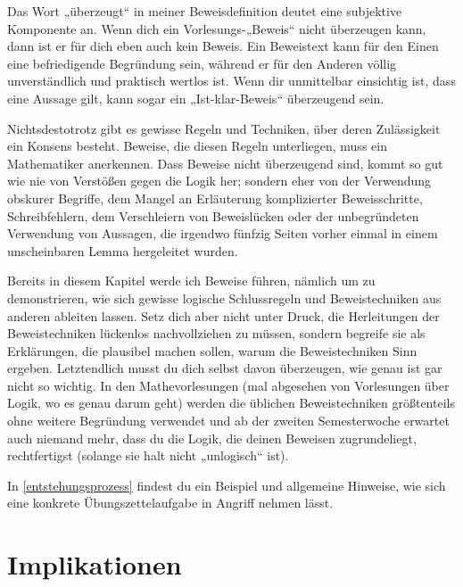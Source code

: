 \begin{bem}
    Das Wort „überzeugt“ in meiner Beweisdefinition deutet eine subjektive Komponente an. Wenn dich ein Vorlesungs-„Beweis“ nicht überzeugen kann, dann ist er für dich eben auch kein Beweis. Ein Beweistext kann für den Einen eine befriedigende Begründung sein, während er für den Anderen völlig unverständlich und praktisch wertlos ist. Wenn dir unmittelbar einsichtig ist, dass eine Aussage gilt, kann sogar ein „Ist-klar-Beweis“ überzeugend sein.
    
    Nichtsdestotrotz gibt es gewisse Regeln und Techniken, über deren Zulässigkeit ein Konsens besteht. Beweise, die diesen Regeln unterliegen, muss ein Mathematiker anerkennen. Dass Beweise nicht überzeugend sind, kommt so gut wie nie von Verstößen gegen die Logik her; sondern eher von der Verwendung obskurer Begriffe, dem Mangel an Erläuterung komplizierter Beweisschritte, Schreibfehlern, dem Verschleiern von Beweislücken oder der unbegründeten Verwendung von Aussagen, die irgendwo fünfzig Seiten vorher einmal in einem unscheinbaren Lemma hergeleitet wurden.
\end{bem}


Bereits in diesem Kapitel werde ich Beweise führen, nämlich um zu demonstrieren, wie sich gewisse logische Schlussregeln und Beweistechniken aus anderen ableiten lassen. Setz dich aber nicht unter Druck, die Herleitungen der Beweistechniken lückenlos nachvollziehen zu müssen, sondern begreife sie als Erklärungen, die plausibel machen sollen, warum die Beweistechniken Sinn ergeben. Letztendlich musst du dich selbst davon überzeugen, wie genau ist gar nicht so wichtig. In den Mathevorlesungen (mal abgesehen von Vorlesungen über Logik, wo es genau darum geht) werden die üblichen Beweistechniken größtenteils ohne weitere Begründung verwendet und ab der zweiten Semesterwoche erwartet auch niemand mehr, dass du die Logik, die deinen Beweisen zugrundeliegt, rechtfertigst (solange sie halt nicht „unlogisch“ ist).


\begin{bem}
    In \cref{entstehungsprozess} findest du ein Beispiel und allgemeine Hinweise, wie sich eine konkrete Übungszettelaufgabe in Angriff nehmen lässt.
\end{bem}





\section{Implikationen}


